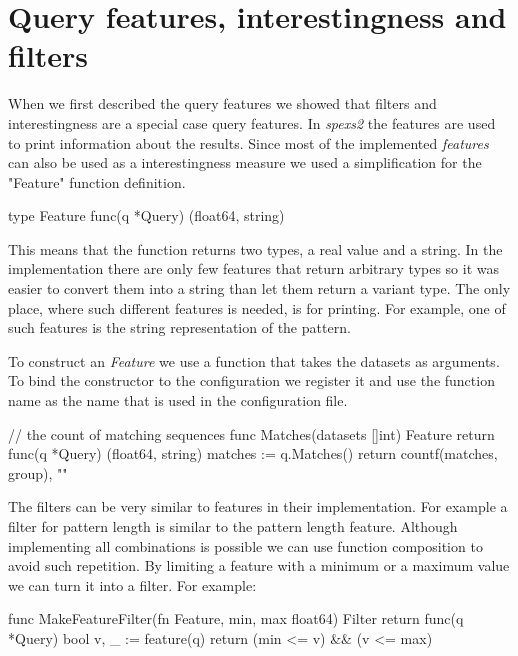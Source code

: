 \section{Query features, interestingness and filters}

When we first described the query features we showed that filters and interestingness are a special case query features. In \emph{spexs2} the features are used to print information about the results. Since most of the implemented \emph{features} can also be used as a interestingness measure we used a simplification for the "Feature" function definition.

\begin{file}
type Feature func(q *Query) (float64, string)
\end{file}

This means that the function returns two types, a real value and a string. In the implementation there are only few features that return arbitrary types so it was easier to convert them into a string than let them return a variant type. The only place, where such different features is needed, is for printing. For example, one of such features is the string representation of the pattern.

To construct an \emph{Feature} we use a function that takes the datasets as arguments. To bind the constructor to the configuration we register it and use the function name as the name that is used in the configuration file.

\begin{file}
// the count of matching sequences
func Matches(datasets []int) Feature {
    return func(q *Query) (float64, string) {
        matches := q.Matches()
        return countf(matches, group), ""
    }
}    
\end{file}

The filters can be very similar to features in their implementation. For example a filter for pattern length is similar to the pattern length feature. Although implementing all combinations is possible we can use function composition to avoid such repetition. By limiting a feature with a minimum or a maximum value we can turn it into a filter. For example:

\begin{file}
func MakeFeatureFilter(fn Feature, min, max float64) Filter {
    return func(q *Query) bool {
        v, _ := feature(q)
        return (min <= v) && (v <= max)
    }
}
\end{file}

